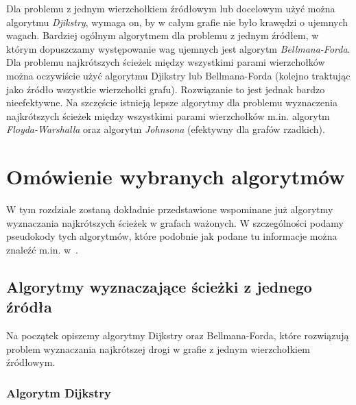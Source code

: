\documentclass[12pt,a4paper]{book}
\theoremstyle{definition}
\numberwithin{equation}{chapter}
\begin{document}
Dla problemu z jednym wierzchołkiem źródłowym lub docelowym użyć można algorytmu \textit{Djikstry}, wymaga on, by w całym grafie nie było krawędzi o ujemnych wagach.
Bardziej ogólnym algorytmem dla problemu z jednym źródłem, w którym dopuszczamy występowanie wag ujemnych jest algorytm \textit{Bellmana-Forda}. 
Dla problemu najkrótszych ścieżek między wszystkimi parami wierzchołków można oczywiście użyć algorytmu Djikstry lub Bellmana-Forda (kolejno traktując jako źródło wszystkie wierzchołki grafu). Rozwiązanie to jest jednak bardzo nieefektywne. Na szczęście istnieją lepsze algorytmy dla problemu wyznaczenia najkrótszych ścieżek między wszystkimi parami wierzchołków m.in. algorytm \textit{Floyda-Warshalla} oraz algorytm \textit{Johnsona} (efektywny dla grafów rzadkich).




\chapter{Omówienie wybranych algorytmów}\label{ch_2}

W tym rozdziale zostaną dokładnie przedstawione wspominane już algorytmy wyznaczania najkrótszych ścieżek w grafach ważonych. W szczególności podamy pseudokody tych algorytmów, które podobnie jak podane tu informacje można znaleźć m.in. w~\cite{ALG_BEZ_TAJ, CORMEN}.

\section{Algorytmy wyznaczające ścieżki z jednego źródła}

Na początek opiszemy algorytmy  Dijkstry oraz Bellmana-Forda, które rozwiązują problem wyznaczania najkrótszej drogi w grafie z jednym wierzchołkiem źródłowym.

\subsection{Algorytm Dijkstry}
\end{document}
